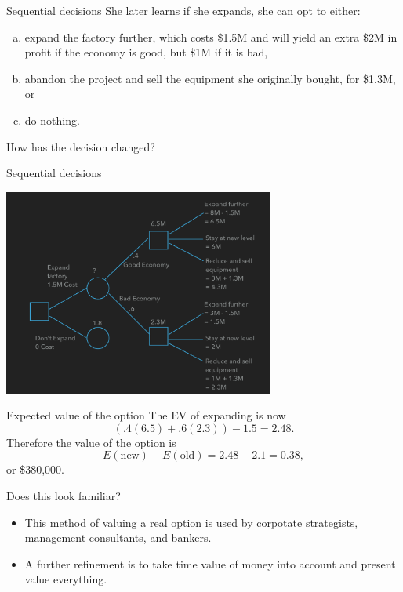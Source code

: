 \documentclass{beamer}\usepackage[]{graphicx}\usepackage[]{color}
\begin{document}
\begin{darkframes}
    \begin{frame}[fragile]{Sequential decisions}
      She later learns if she expands, she can opt to either:
      \begin{enumerate}[(a)]
        \item expand the factory further, which costs \$1.5M and will yield an extra \$2M in profit if the economy is good, but \$1M if it is bad, 
        \item abandon the project and sell the equipment she originally bought, for \$1.3M, or
        \item do nothing.
      \end{enumerate}
      How has the decision changed?
    \end{frame}

    \begin{frame}[fragile]{Sequential decisions}
      \begin{center}
        \includegraphics[width=3.5in]{SequentialDecision} \\
      \end{center}

    \lc %
    \end{frame}


    \begin{frame}[fragile]{Expected value of the option}
        The EV of expanding is now 
        \[ (.4(6.5) + .6(2.3)) - 1.5 = 2.48. \]
        \pause
        Therefore the value of the option is
        \[ E(\text{new}) - E(\text{old}) = 2.48 - 2.1 = 0.38, \] 
        or \$380,000.
    \end{frame}


    \begin{frame}[fragile]{Does this look familiar?}
      \begin{itemize}[<+->]
        \item This method of valuing a real option is used by corpotate strategists, management consultants, and bankers. 
        \item A further refinement is to take time value of money into account and present value everything.
      \end{itemize}
    \end{frame}
  \end{darkframes}
\end{document}
